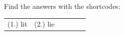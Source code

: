     \label{m39392*eip-770}
\par {} Find the answers with the shortcodes:
 \par \begin{tabular}[h]{cccccc}
 (1.) lit  &  (2.) lie  & \end{tabular}
%       
